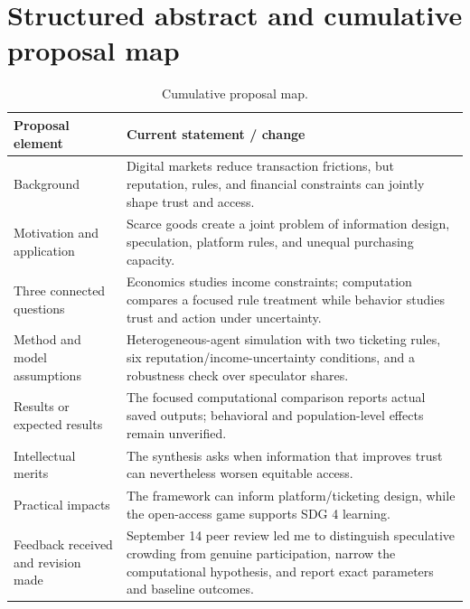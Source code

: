 \section{Structured abstract and cumulative proposal map}\label{app:abstract}
\begin{table}[H]
\caption{Cumulative proposal map.}
\label{tab:abstract-map}
\renewcommand{\arraystretch}{1.18}
\begin{tabularx}{\textwidth}{@{}p{}Y@{}}
\toprule
\textbf{Proposal element} & \textbf{Current statement / change} \\
\midrule
Background & Digital markets reduce transaction frictions, but reputation, rules, and financial constraints can jointly shape trust and access. \\
Motivation and application & Scarce goods create a joint problem of information design, speculation, platform rules, and unequal purchasing capacity. \\
Three connected questions & Economics studies income constraints; computation compares a focused rule treatment while behavior studies trust and action under uncertainty. \\
Method and model assumptions & Heterogeneous-agent simulation with two ticketing rules, six reputation/income-uncertainty conditions, and a robustness check over speculator shares. \\
Results or expected results & The focused computational comparison reports actual saved outputs; behavioral and population-level effects remain unverified. \\
Intellectual merits & The synthesis asks when information that improves trust can nevertheless worsen equitable access. \\
Practical impacts & The framework can inform platform/ticketing design, while the open-access game supports SDG 4 learning. \\
Feedback received and revision made & September 14 peer review led me to distinguish speculative crowding from genuine participation, narrow the computational hypothesis, and report exact parameters and baseline outcomes. \\
\bottomrule
\end{tabularx}
\end{table}
